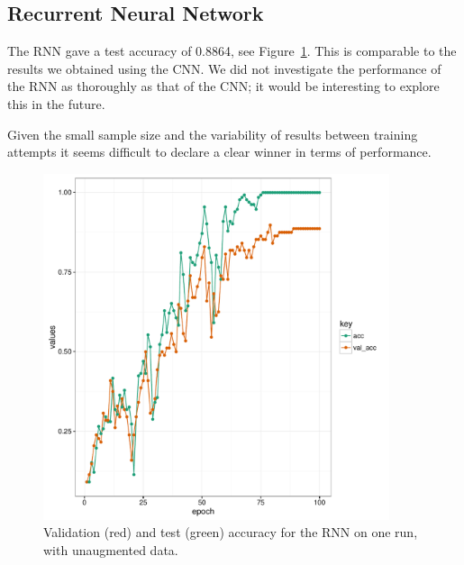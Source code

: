 \subsection{Recurrent Neural Network}

The RNN gave a test accuracy of 0.8864, see Figure~\ref{fig:2d_rnn_acc}. This is comparable to the results we obtained using the CNN. We did not investigate the performance of the RNN as thoroughly as that of the CNN; it would be interesting to explore this in the future.

Given the small sample size and the variability of results between training attempts it seems difficult to declare a clear winner in terms of performance.

\begin{figure}[h]
\begin{center}
\includegraphics[height = 4in, width = 4in]{rnn_2d_plot_acc.pdf}
\end{center}
\caption{Validation (red) and test (green) accuracy for the RNN on one run, with unaugmented data.}
\label{fig:2d_rnn_acc}
\end{figure}
